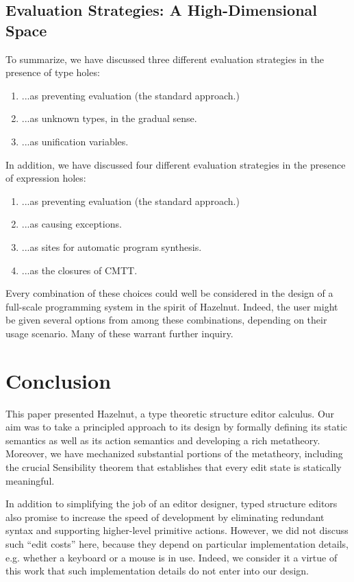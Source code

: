 \documentclass[preprint,9pt]{sigplanconf}
\begin{document}
\subsection{Evaluation Strategies: A High-Dimensional Space}
To summarize, we have discussed three different evaluation strategies in
the presence of type holes:
\begin{enumerate}[noitemsep]
\item ...as preventing evaluation (the standard approach.)
\item ...as unknown types, in the gradual sense.
\item ...as unification variables.
\end{enumerate}
In addition, we have discussed four different evaluation strategies in the
presence of expression holes:
\begin{enumerate}[noitemsep]
\item ...as preventing evaluation (the standard approach.)
\item ...as causing exceptions.
\item ...as sites for automatic program synthesis.
\item ...as the closures of CMTT.
\end{enumerate}

Every combination of these choices could well be considered in the design
of a full-scale programming system in the spirit of Hazelnut. Indeed, the
user might be given several options from among these combinations,
depending on their usage scenario. Many of these warrant further inquiry.

\section{Conclusion}
\label{sec:future}
This paper presented Hazelnut, a type theoretic structure editor
calculus. Our aim was to take a principled approach to its design by
formally defining its static semantics as well as its action semantics and
developing a rich metatheory. Moreover, we have mechanized substantial
portions of the metatheory, including the crucial Sensibility theorem that
establishes that every edit state is statically meaningful.

In addition to simplifying the job of an editor designer, typed structure
editors also promise to increase the speed of development by eliminating
redundant syntax and supporting higher-level primitive actions. However, we
did not discuss such ``edit costs'' here, because they depend on particular
implementation details, e.g. whether a keyboard or a mouse is in
use. Indeed, we consider it a virtue of this work that such implementation
details do not enter into our design.
\end{document}

